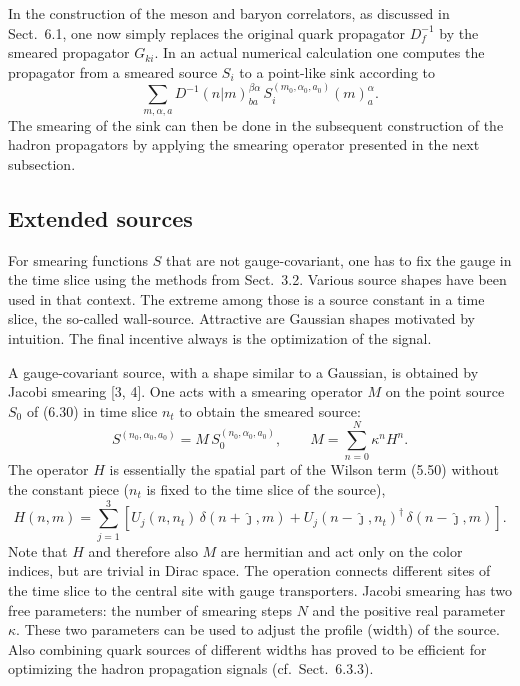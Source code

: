 In the construction of the meson and baryon correlators, as discussed in
Sect.~6.1, one now simply replaces the original quark propagator $D_f^{-1}$ by
the smeared propagator $G_{ki}$. In an actual numerical calculation one
computes the propagator from a smeared source $S_i$ to a point-like sink
according to
\begin{equation}
  \sum_{m,\alpha,a} D^{-1}(n|m)^{\beta\alpha}_{ba}\,
    S_i^{(m_0,\alpha_0,a_0)}(m)^{\alpha}_{a} .
\end{equation}
The smearing of the sink can then be done in the subsequent construction of the
hadron propagators by applying the smearing operator presented in the next
subsection.

\subsection{Extended sources}

For smearing functions $S$ that are not gauge-covariant, one has to fix the
gauge in the time slice using the methods from Sect.~3.2. Various source shapes
have been used in that context. The extreme among those is a source constant in
a time slice, the so-called wall-source. Attractive are Gaussian shapes
motivated by intuition. The final incentive always is the optimization of the
signal.

A gauge-covariant source, with a shape similar to a Gaussian, is obtained by
Jacobi smearing [3, 4]. One acts with a smearing operator $M$ on the point
source $S_0$ of (6.30) in time slice $n_t$ to obtain the smeared source:
\begin{equation}
  S^{(n_0,\alpha_0,a_0)} = M\, S_0^{(n_0,\alpha_0,a_0)}, \qquad
  M = \sum_{n=0}^{N} \kappa^n H^n .
\end{equation}
The operator $H$ is essentially the spatial part of the Wilson term (5.50)
without the constant piece ($n_t$ is fixed to the time slice of the source),
\begin{equation}
  H(n, m) = \sum_{j=1}^{3}\left[ U_j(n, n_t)\, \delta(n + \hat{\jmath}, m)
    + U_j(n - \hat{\jmath}, n_t)^\dagger\, \delta(n - \hat{\jmath}, m) \right].
\end{equation}
Note that $H$ and therefore also $M$ are hermitian and act only on the color
indices, but are trivial in Dirac space. The operation connects different sites
of the time slice to the central site with gauge transporters. Jacobi smearing
has two free parameters: the number of smearing steps $N$ and the positive real
parameter $\kappa$. These two parameters can be used to adjust the profile
(width) of the source. Also combining quark sources of different widths has
proved to be efficient for optimizing the hadron propagation signals
(cf.\ Sect.~6.3.3).

